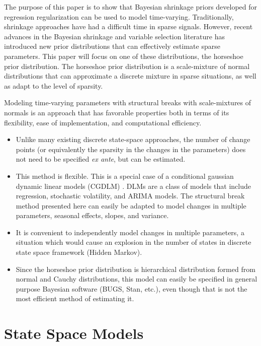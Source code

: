 \documentclass{article}
\begin{document}
The purpose of this paper is to show that Bayesian shrinkage priors developed for regression regularization can be used to model time-varying.
Traditionally, shrinkage approaches have had a difficult time in sparse signals.
However, recent advances in the Bayesian shrinkage and variable selection literature has introduced new prior distributions that can effectively estimate sparse parameters. 
This paper will focus on one of these distributions, the horseshoe prior distribution.
The horseshoe prior distribution is a scale-mixture of normal distributions that can approximate a discrete mixture in sparse situations, as well as adapt to the level of sparsity.

Modeling time-varying parameters with structural breaks with scale-mixtures of normals is an approach that has favorable properties both in terms of its flexibility, ease of implementation, and computational efficiency.
\begin{itemize}
\item Unlike many existing discrete state-space approaches, the number of change points (or equivalently the sparsity in the changes in the parameters) does not need to be specified \textit{ex ante}, but can be estimated.
\item This method is flexible.
  This is a special case of a conditional gaussian dynamic linear models (CGDLM) \parencites{WestHarrison1997}{DurbinKoopman2001}{CommandeurKoopman2007}{ShumwayStoffer2010}.
  DLMs are a class of models that include regression, stochastic volatility, and ARIMA models.
  The structural break method presented here can easily be adapted to model changes in multiple parameters, seasonal effects, slopes, and variance.
\item It is convenient to independently model changes in multiple parameters, a situation which would cause an explosion in the number of states in discrete state space framework (Hidden Markov).
\item Since the horseshoe prior distribution is hierarchical distribution formed from normal and Cauchy distributions, this model can easily be specified in general purpose Bayesian software (BUGS, Stan, etc.), even though that is not the most efficient method of estimating it.
\end{itemize}

\section{State Space Models}
\end{document}
